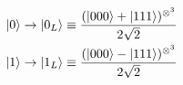 \documentclass[10pt]{beamer}
\theoremstyle{remark}
\theoremstyle{definition}
\begin{document}
\begin{frame}[allowframebreaks]
    \begin{figure}
        \centering
        \begin{subfigure}{0.5\textwidth}
            \begin{gather*}
                \ket{0} \rightarrow \ket{0_L} \equiv \frac{(\ket{000} + \ket{111})^{\otimes^3}}{2\sqrt{2}} \\
                \ket{1} \rightarrow \ket{1_L} \equiv \frac{(\ket{000} - \ket{111})^{\otimes^3}}{2\sqrt{2}}
            \end{gather*}
        \end{subfigure}%
        \begin{subfigure}{0.5\textwidth}
            \centering
        \end{subfigure}
    \end{figure}


\end{frame}
\end{document}
